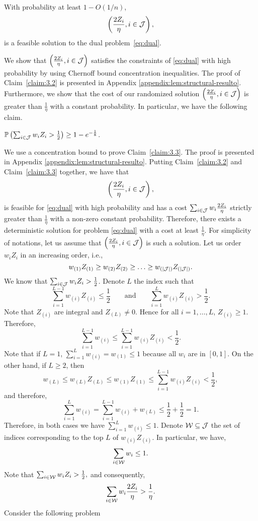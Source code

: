 \documentclass[moor]{informs1}              %
\begin{document}
\begin{claim}\label{claim:3.2} 
With probability at least $1- O(1/n)$, $$\left( \frac{ 2 Z_i}{\eta},{ i \in {\cal J}}\right),$$ is a feasible solution to the dual problem~\eqref{eq:dual}.
\end{claim}
\vspace{2mm}
\noindent 
We show that  $  \left( \frac{ 2 Z_i}{\eta},{ i \in {\cal J}}\right)$ satisfies the constraints of \eqref{eq:dual} with high probability by using Chernoff bound concentration inequalities. The proof of Claim~\ref{claim:3.2} is presented in Appendix \ref{appendix:lem:structural-resulto}. Furthermore, we show that the cost of our randomized solution   $\left( \frac{ 2 Z_i}{\eta},{ i \in {\cal J}}\right)$ is greater than $\frac{1}{\eta}$ with a constant probability. In particular, we have the following claim.

\begin{claim}\label{claim:3.3} 
$   \mathbb{P} \left(       \sum_{i \in {\cal J}}w_i Z_i  > \frac{1}{2} \right) \geq 1 - e^{  -\frac{ 1}{8}}$.
\end{claim} 


We use a concentration bound to prove Claim~\ref{claim:3.3}. The proof is presented in Appendix \ref{appendix:lem:structural-resulto}. Putting Claim~\ref{claim:3.2} and Claim~\ref{claim:3.3} together,  we have that 
$$  \left( \frac{ 2 Z_i}{\eta},{ i \in {\cal J}}\right),$$ 
is feasible for \eqref{eq:dual}  with high probability and has a cost $\sum_{i \in {\cal J}}w_i \frac{ 2 Z_i}{\eta} $ strictly greater than $ \frac{1}{\eta}$ with a non-zero constant probability. Therefore, there exists a deterministic solution for problem \eqref{eq:dual} with a cost at least  $\frac{1}{\eta}$. For simplicity of notations, let us assume that $  \left( \frac{ 2 Z_i}{\eta},{ i \in {\cal J}}\right)$ is such a solution. Let us order $w_i Z_i$ in an increasing order, i.e.,
$$ w_{(1)} Z_{(1)} \geq w_{(2)} Z_{(2)} \geq \ldots \geq w_{(\vert {\cal J} \vert )} Z_{(\vert {\cal J} \vert)}.$$
We know that $\sum_{i \in {\cal J}} w_i Z_i > \frac{1}{2}$. Denote $L$ the index such that 
$$ \sum_{i =1}^{L-1}w_{(i)} Z_{(i)}   \leq \frac{1}{2} \qquad \text{and} \qquad \sum_{i =1}^{L}w_{(i)}  Z_{(i)}  > \frac{1}{2}.$$
Note that $Z_{(i)}  $ are integral and $Z_{(L)} \neq 0$. Hence for all $i=1, \ldots, L$, $Z_{(i)} \geq 1$. Therefore,
$$ \sum_{i =1}^{L-1}w_{(i)}  \leq  \sum_{i =1}^{L-1}w_{(i)}Z_{(i)}  <  \frac{1}{2}.$$
Note that if $L=1$, $\sum_{i =1}^{L}w_{(i)}   = w_{(1)} \leq 1$ because all $w_i$ are in $[0,1]$. On the other hand, if $L \geq 2$, then 
$$w_{(L)} \leq w_{(L)}  Z_{(L)} \leq w_{(1)}  Z_{(1)}  \leq \sum_{i =1}^{L-1}w_{(i)} Z_{(i)}  < \frac{1}{2},$$
and therefore,
$$ \sum_{i =1}^{L}w_{(i)} = \sum_{i =1}^{L-1}w_{(i)}+ w_{(L)}   \leq \frac{1}{2}+ \frac{1}{2 }=1.$$
Therefore, in both cases we have $\sum_{i =1}^{L}w_{(i)}  \leq 1.$
Denote ${\cal W} \subseteq {\cal J} $ the set of indices corresponding  to the top $L$ of $w_{(i)} Z_{(i)}$. In particular, we have, 
$$ \sum_{i \in {\cal W}} w_i \leq 1. $$
Note that $ \sum_{i \in {\cal W}} w_i Z_i > \frac{1}{2},$ and consequently, $$ \sum_{i \in {\cal W}} w_i \frac{2 Z_i}{\eta} > \frac{1}{\eta}.$$  Consider the following problem 
\end{document}
